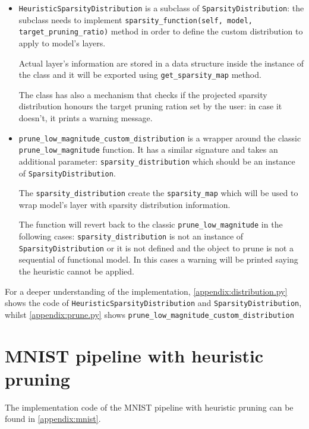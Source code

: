 \begin{itemize}
    \item \texttt{HeuristicSparsityDistribution} is a subclass of \linebreak
        \texttt{SparsityDistribution}: the subclass needs to implement
        \linebreak
        \texttt{sparsity\_function\string(self, model, target\_pruning\_ratio\string)}
        method in order to define the custom distribution to apply to model's
        layers.

        Actual layer's information are stored in a data structure inside the
        instance of the class and it will be exported using
        \texttt{get\_sparsity\_map} method.

        The class has also a mechanism that checks if the projected sparsity
        distribution honours the target pruning ration set by the user: in case
        it doesn't, it prints a warning message.
    \item \texttt{prune\_low\_magnitude\_custom\_distribution} is a wrapper
        around the classic \texttt{prune\_low\_magnitude} function. It has a
        similar signature and takes an additional parameter:
        \texttt{sparsity\_distribution} which should be an instance of
        \texttt{SparsityDistribution}.

        The \texttt{sparsity\_distribution} create the \texttt{sparsity\_map}
        which will be used to wrap model's layer with sparsity distribution
        information.

        The function will revert back to the classic
        \texttt{prune\_low\_magnitude} in the following cases:
        \texttt{sparsity\_distribution} is not an instance of \linebreak
        \texttt{SparsityDistribution} or it is not defined and the object to
        prune is not a sequential of functional model. In this cases a warning
        will be printed saying the heuristic cannot be applied.
\end{itemize}

For a deeper understanding of the implementation,
\autoref{appendix:distribution.py} shows the code of
\texttt{HeuristicSparsityDistribution} and \texttt{SparsityDistribution},
whilst \autoref{appendix:prune.py} shows
\texttt{prune\_low\_magnitude\_custom\_distribution}

\section{MNIST pipeline with heuristic pruning}\label{sec:mnistpipeline}
The implementation code of the MNIST pipeline with heuristic pruning can be
found in \autoref{appendix:mnist}.

